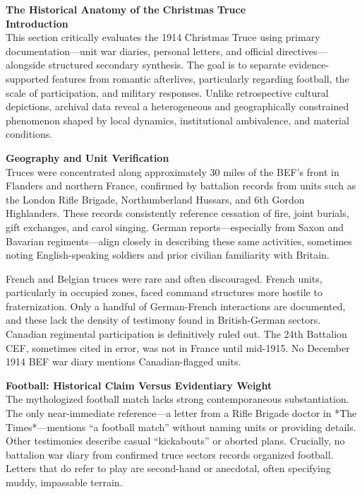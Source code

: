 \begin{technical}
{\Large\textbf{The Historical Anatomy of the Christmas Truce}}\\[0.7em]

\noindent\textbf{Introduction}\\[0.5em]
This section critically evaluates the 1914 Christmas Truce using primary documentation—unit war diaries, personal letters, and official directives—alongside structured secondary synthesis. The goal is to separate evidence-supported features from romantic afterlives, particularly regarding football, the scale of participation, and military responses. Unlike retrospective cultural depictions, archival data reveal a heterogeneous and geographically constrained phenomenon shaped by local dynamics, institutional ambivalence, and material conditions.

\noindent\textbf{Geography and Unit Verification}\\[0.5em]
Truces were concentrated along approximately 30 miles of the BEF’s front in Flanders and northern France, confirmed by battalion records from units such as the London Rifle Brigade, Northumberland Hussars, and 6th Gordon Highlanders. These records consistently reference cessation of fire, joint burials, gift exchanges, and carol singing. German reports—especially from Saxon and Bavarian regiments—align closely in describing these same activities, sometimes noting English-speaking soldiers and prior civilian familiarity with Britain.

French and Belgian truces were rare and often discouraged. French units, particularly in occupied zones, faced command structures more hostile to fraternization. Only a handful of German-French interactions are documented, and these lack the density of testimony found in British-German sectors. Canadian regimental participation is definitively ruled out. The 24th Battalion CEF, sometimes cited in error, was not in France until mid-1915. No December 1914 BEF war diary mentions Canadian-flagged units.

\noindent\textbf{Football: Historical Claim Versus Evidentiary Weight}\\[0.5em]
The mythologized football match lacks strong contemporaneous substantiation. The only near-immediate reference—a letter from a Rifle Brigade doctor in *The Times*—mentions “a football match” without naming units or providing details. Other testimonies describe casual “kickabouts” or aborted plans. Crucially, no battalion war diary from confirmed truce sectors records organized football. Letters that do refer to play are second-hand or anecdotal, often specifying muddy, impassable terrain.


\end{technical}
